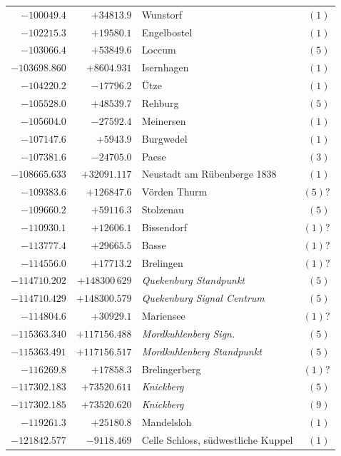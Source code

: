 \begin{center}
\begin{tabular}{r|r|p{170pt}|r}
\(-100049.4\)&\(+34813.9\)&Wunstorf&\((1)\)\\
\(-102215.3\)&\(+19580.1\)&Engelbostel&\((1)\)\\
\(-103066.4\)&\(+53849.6\)&Loccum&\((5)\)\\
\(-103698.860\)&\(+8604.931\)&Isernhagen&\((1)\)\\
\(-104220.2\)&\(-17796.2\)&Ütze&\((1)\)\\
\(-105528.0\)&\(+48539.7\)&Rehburg&\((5)\)\\
\(-105604.0\)&\(-27592.4\)&Meinersen&\((1)\)\\
\(-107147.6\)&\(+5943.9\)&Burgwedel&\((1)\)\\
\(-107381.6\)&\(-24705.0\)&Paese&\((3)\)\\
\(-108665.633\)&\(+32091.117\)&Neustadt am Rübenberge 1838&\((1)\)\\
\(-109383.6\)&\(+126847.6\)&Vörden Thurm&\((5)?\)\\
\(-109660.2\)&\(+59116.3\)&Stolzenau&\((5)\)\\
\(-110930.1\)&\(+12606.1\)&Bissendorf&\((1)?\)\\
\(-113777.4\)&\(+29665.5\)&Basse&\((1)?\)\\
\(-114556.0\)&\(+17713.2\)&Brelingen&\((1)?\)\\
\(-114710.202\)&\(+148300\,629\)&\textit{Quekenburg Standpunkt}&\((5)\)\\
\(-114710.429\)&\(+148300.579\)&\textit{Quekenburg Signal Centrum}&\((5)\)\\
\(-114804.6\)&\(+30929.1\)&Mariensee&\((1)?\)\\
\(-115363.340\)&\(+117156.488\)&\textit{Mordkuhlenberg Sign.}&\((5)\)\\
\(-115363.491\)&\(+117156.517\)&\textit{Mordkuhlenberg Standpunkt}&\((5)\)\\
\(-116269.8\)&\(+17858.3\)&Brelingerberg&\((1)?\)\\
\(-117302.183\)&\(+73520.611\)&\textit{Knickberg}&\((5)\)\\
\(-117302.185\)&\(+73520.620\)&\textit{Knickberg}&\((9)\)\\
\(-119261.3\)&\(+25180.8\)&Mandelsloh&\((1)\)\\
\(-121842.577\)&\(-9118.469\)&Celle Schloss, südwestliche Kuppel&\((1)\)\\
\hline\end{tabular}\endgroup\end{center}
